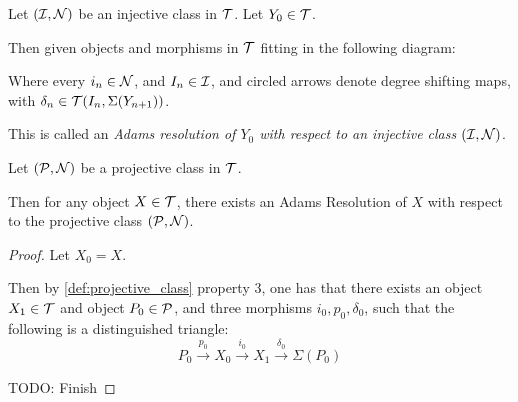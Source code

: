 \begin{definition} %
    Let \( ({\mathcal{I}}, {\mathcal{N}}) \) be an injective class in \( {\mathcal{T}} \). Let \( Y_0 \in {\mathcal{T}} \).

    Then given objects and morphisms in \( {\mathcal{T}} \) fitting in the following diagram:

    \begin{center}
    \end{center}

    Where every \( i_n \in {\mathcal{N}} \), and \( I_n \in {\mathcal{I}} \), and circled arrows denote degree shifting maps, with \( \delta_n \in {\mathcal{T}}(I_n, \Sigma(Y_{n + 1})) \). %

    This is called an \emph{Adams resolution of \( Y_0 \) with respect to an injective class \( ({\mathcal{I}}, {\mathcal{N}}) \)}.
\end{definition}

\begin{theorem} %
    Let \( ({\mathcal{P}}, {\mathcal{N}}) \) be a projective class in \( {\mathcal{T}} \).

    Then for any object \( X \in {\mathcal{T}} \), there exists an Adams Resolution of \( X \) with respect to the projective class \( ({\mathcal{P}}, {\mathcal{N}}) \).
\end{theorem}
\begin{proof}
    Let \( X_0 = X \).

    Then by \autoref{def:projective_class} property 3, one has that there exists an object \( X_1 \in {\mathcal{T}} \) and object \( P_0 \in {\mathcal{P}} \), and three morphisms \( i_0, p_0, \delta_0 \), such that the following is a distinguished triangle:
    \[
        P_0 \stackrel{p_0}{\longrightarrow} X_0 \stackrel{i_0}{\longrightarrow} X_1 \stackrel{\delta_0}{\longrightarrow} \Sigma(P_0)
    \]

    TODO: Finish
\end{proof}


